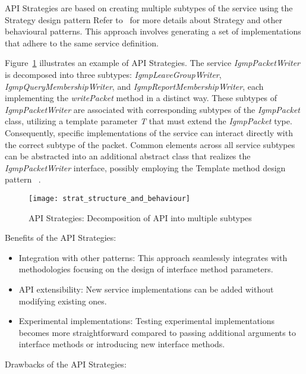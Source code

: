 API Strategies are based on creating multiple subtypes of the service using the Strategy design pattern
Refer to~\cite[Chapter~18]{posa4} for more details about Strategy and other behavioural patterns.
This approach involves generating a set of implementations that adhere to the same service definition.

Figure~\ref{fig:strat_structure_and_behaviour} illustrates an example of API Strategies.
The service \textit{IgmpPacketWriter} is decomposed into three subtypes: \textit{IgmpLeaveGroupWriter},
\textit{IgmpQueryMembershipWriter}, and \textit{IgmpReportMembershipWriter},
each implementing the \textit{writePacket} method in a distinct way.
These subtypes of \textit{IgmpPacketWriter} are associated with corresponding subtypes of the \textit{IgmpPacket} class,
utilizing a template parameter \textit{T} that must extend the \textit{IgmpPacket} type.
Consequently, specific implementations of the service can interact directly with the correct subtype of the packet.
Common elements across all service subtypes can be abstracted into an additional abstract class that realizes
the \textit{IgmpPacketWriter} interface, possibly employing the Template method design pattern
~\cite[Chapter~18]{posa4}.

\begin{figure}[!htb]
    \centering
    \texttt{[image: strat\_structure\_and\_behaviour]}
    \caption{API Strategies: Decomposition of API into multiple subtypes}
    \label{fig:strat_structure_and_behaviour}
\end{figure}

Benefits of the API Strategies:

\begin{itemize}
    \item Integration with other patterns:
    This approach seamlessly integrates with methodologies focusing on the design of interface method parameters.
    \item API extensibility:
    New service implementations can be added without modifying existing ones.
    \item Experimental implementations:
    Testing experimental implementations becomes more straightforward compared to passing additional arguments
    to interface methods or introducing new interface methods.
\end{itemize}

Drawbacks of the API Strategies:

